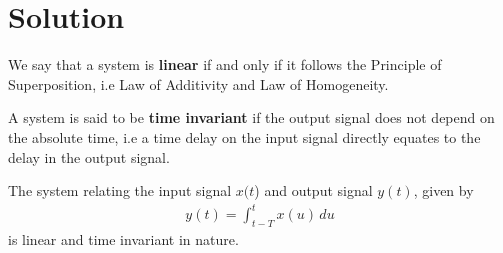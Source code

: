 \documentclass[journal,12pt,twocolumn]{IEEEtran}
\begin{document}
\section{Solution}
\begin{definition}
We say that a system is\textbf{ linear} if and only if it follows the Principle of Superposition, i.e Law of Additivity and Law of Homogeneity.
\label{L}
\end{definition}
\begin{definition}
A system is said to be \textbf{time invariant} if the output signal does not depend on the absolute time, i.e a time delay on the input signal directly equates to the delay in the output signal.
\label{T}
\end{definition}
\begin{lemma}
The system relating the input signal $x(t$) and output signal $y(t)$, given by 
\begin{align}
     y(t) = \int_{t-T}^tx(u)\,du
\end{align}
is linear and time invariant in nature.
\end{lemma}
\end{document}
